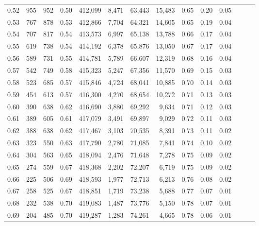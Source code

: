 \begin{tabular}{rrrrrrrrrrrrrr}
0.52 &     955 &    952 &  0.50 &  412,099 &    8,471 &  63,443 &  15,483 &  0.65 &  0.20 &      0.05 \\
0.53 &     767 &    878 &  0.53 &  412,866 &    7,704 &  64,321 &  14,605 &  0.65 &  0.19 &      0.04 \\
0.54 &     707 &    817 &  0.54 &  413,573 &    6,997 &  65,138 &  13,788 &  0.66 &  0.17 &      0.04 \\
0.55 &     619 &    738 &  0.54 &  414,192 &    6,378 &  65,876 &  13,050 &  0.67 &  0.17 &      0.04 \\
0.56 &     589 &    731 &  0.55 &  414,781 &    5,789 &  66,607 &  12,319 &  0.68 &  0.16 &      0.04 \\
0.57 &     542 &    749 &  0.58 &  415,323 &    5,247 &  67,356 &  11,570 &  0.69 &  0.15 &      0.03 \\
0.58 &     523 &    685 &  0.57 &  415,846 &    4,724 &  68,041 &  10,885 &  0.70 &  0.14 &      0.03 \\
0.59 &     454 &    613 &  0.57 &  416,300 &    4,270 &  68,654 &  10,272 &  0.71 &  0.13 &      0.03 \\
0.60 &     390 &    638 &  0.62 &  416,690 &    3,880 &  69,292 &   9,634 &  0.71 &  0.12 &      0.03 \\
0.61 &     389 &    605 &  0.61 &  417,079 &    3,491 &  69,897 &   9,029 &  0.72 &  0.11 &      0.03 \\
0.62 &     388 &    638 &  0.62 &  417,467 &    3,103 &  70,535 &   8,391 &  0.73 &  0.11 &      0.02 \\
0.63 &     323 &    550 &  0.63 &  417,790 &    2,780 &  71,085 &   7,841 &  0.74 &  0.10 &      0.02 \\
0.64 &     304 &    563 &  0.65 &  418,094 &    2,476 &  71,648 &   7,278 &  0.75 &  0.09 &      0.02 \\
0.65 &     274 &    559 &  0.67 &  418,368 &    2,202 &  72,207 &   6,719 &  0.75 &  0.09 &      0.02 \\
0.66 &     225 &    506 &  0.69 &  418,593 &    1,977 &  72,713 &   6,213 &  0.76 &  0.08 &      0.02 \\
0.67 &     258 &    525 &  0.67 &  418,851 &    1,719 &  73,238 &   5,688 &  0.77 &  0.07 &      0.01 \\
0.68 &     232 &    538 &  0.70 &  419,083 &    1,487 &  73,776 &   5,150 &  0.78 &  0.07 &      0.01 \\
0.69 &     204 &    485 &  0.70 &  419,287 &    1,283 &  74,261 &   4,665 &  0.78 &  0.06 &      0.01 \\

\end{tabular}
